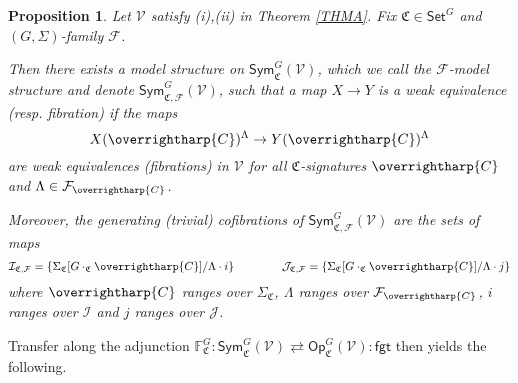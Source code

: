 \documentclass[a4paper,10pt
,draft
]{article}%
\numberwithin{equation}{section}
\numberwithin{figure}{section}
\newtheorem{proposition}[equation]{Proposition}%
\theoremstyle{definition} %
\newcommand{\vect}[1]{\text{\overrightharp{\ensuremath{#1}}}}
\newcommand{\Sym}{\ensuremath{\mathsf{Sym}}}%
\newcommand{\F}{\ensuremath{\mathcal F}}
\newcommand{\V}{\ensuremath{\mathcal V}}
\newcommand{\1}{\ensuremath{\mathbbm 1}}%
\begin{document}
\begin{proposition}\label{SYMGFV PROP}
	Let $\V$ satisfy
	(i),(ii) in Theorem \ref{THMA}.
	Fix $\mathfrak{C} \in \mathsf{Set}^G$
	and $(G,\Sigma)$-family $\F$.
	
	Then there exists a model structure on
	$\mathsf{Sym}^G_{\mathfrak{C}}(\mathsf{\V})$,
	which we call the \emph{$\mathcal{F}$-model structure}
	and denote $\mathsf{Sym}^G_{\mathfrak{C},\F}(\V)$,
	such that a map $X \to Y$
	is a weak equivalence (resp. fibration) if the maps
\begin{equation}
	X(\vect{C})^{\Lambda} \to Y(\vect{C})^{\Lambda}
\end{equation}
	are weak equivalences (fibrations) in $\V$
	for all $\mathfrak{C}$-signatures $\vect{C}$
	and $\Lambda \in \F_{\vect{C}}$.	
	
	Moreover, the generating (trivial) cofibrations of
	$\Sym^{G}_{\mathfrak{C},\F}(\V)$
	are the sets of maps
	\begin{equation}\label{VGSIGF EQ}
	\mathcal{I}_{\mathfrak{C},\mathcal{F}}
	=
	\left\{
	\Sigma_{\mathfrak{C}}[G \cdot_{\mathfrak{C}} \vect{C}]/\Lambda \cdot i
	\right\}
	\qquad \qquad
	\mathcal{J}_{\mathfrak{C},\mathcal{F}}
	=
	\left\{
	\Sigma_{\mathfrak{C}}[G \cdot_{\mathfrak{C}} \vect{C}]/\Lambda \cdot j
	\right\}
	\end{equation}
	where $\vect{C}$ ranges over $\Sigma_{\mathfrak{C}}$,
	$\Lambda$ ranges over $\F_{\vect{C}}$,
	$i$ ranges over $\mathcal{I}$ and
	$j$ ranges over $\mathcal{J}$.
\end{proposition}



Transfer along the adjunction
$
\mathbb{F}^G_{\mathfrak{C}} \colon
\mathsf{Sym}^G_{\mathfrak{C}}(\V)
\rightleftarrows
\mathsf{Op}^G_{\mathfrak{C}}(\V)
\colon \mathsf{fgt}
$
then yields the following.
\end{document}
